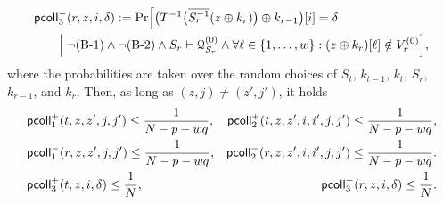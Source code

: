 \begin{lemma}
\begin{align*}
	&\mathsf{pcoll}_{3}^-(r,z,i,\delta)      :={\Pr}\Big[\big(T^{-1}\big(\overline{S_r^{-1}}(z\oplus k_r)\big)\oplus k_{r-1}\big)[i]=\delta    \\
	&\ \ \ \ \ ~\Big|~\neg\text{(B-1)}\wedge\neg\text{(B-2)}\wedge S_r\vdash\mathcal{Q}_{S_r}^{(0)}\wedge\forall\ell\in\{1,\ldots,w\}:(z\oplus k_r)[\ell]\notin V_r^{(0)}\Big],
	\end{align*}
	where the probabilities are taken over the random choices of $S_t$, $k_{t-1}$, $k_t$, $S_r$, $k_{r-1}$, and $k_r$. Then, as long as $(z,j)\neq(z',j')$, it holds
	\begin{align}
	&\mathsf{pcoll}_{1}^+(t,z,z',j,j')\leq\frac{1}{N-p-wq},  &\mathsf{pcoll}_{2}^+(t,z,z',i,i',j,j')\leq\frac{1}{N-p-wq},    \notag    \\
	&\mathsf{pcoll}_{1}^-(r,z,z',j,j')\leq\frac{1}{N-p-wq},  &\mathsf{pcoll}_{2}^-(r,z,z',i,i',j,j')\leq\frac{1}{N-p-wq}.    \notag   \\
	&\mathsf{pcoll}_{3}^+(t,z,i,\delta)\leq\frac{1}{N}, 
	&\mathsf{pcoll}_{3}^-(r,z,i,\delta)\leq\frac{1}{N}.    \notag
	\end{align}
\end{lemma}
